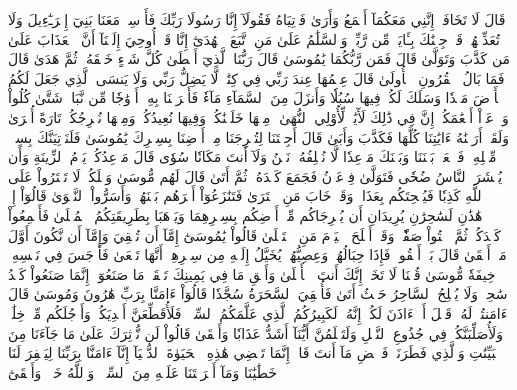 قَالَ لَا تَخَافَآۖ إِنَّنِي مَعَكُمَآ أَسۡمَعُ وَأَرَىٰ
فَأۡتِيَاهُ فَقُولَآ إِنَّا رَسُولَا رَبِّكَ فَأَرۡسِلۡ مَعَنَا بَنِيٓ إِسۡرَـٰٓءِيلَ وَلَا تُعَذِّبۡهُمۡۖ قَدۡ جِئۡنَٰكَ بِـَٔايَةٖ مِّن رَّبِّكَۖ وَٱلسَّلَٰمُ عَلَىٰ مَنِ ٱتَّبَعَ ٱلۡهُدَىٰٓ
إِنَّا قَدۡ أُوحِيَ إِلَيۡنَآ أَنَّ ٱلۡعَذَابَ عَلَىٰ مَن كَذَّبَ وَتَوَلَّىٰ
قَالَ فَمَن رَّبُّكُمَا يَٰمُوسَىٰ
قَالَ رَبُّنَا ٱلَّذِيٓ أَعۡطَىٰ كُلَّ شَيۡءٍ خَلۡقَهُۥ ثُمَّ هَدَىٰ
قَالَ فَمَا بَالُ ٱلۡقُرُونِ ٱلۡأُولَىٰ
قَالَ عِلۡمُهَا عِندَ رَبِّي فِي كِتَٰبٖۖ لَّا يَضِلُّ رَبِّي وَلَا يَنسَى
ٱلَّذِي جَعَلَ لَكُمُ ٱلۡأَرۡضَ مَهۡدٗا وَسَلَكَ لَكُمۡ فِيهَا سُبُلٗا وَأَنزَلَ مِنَ ٱلسَّمَآءِ مَآءٗ فَأَخۡرَجۡنَا بِهِۦٓ أَزۡوَٰجٗا مِّن نَّبَاتٖ شَتَّىٰ
كُلُواْ وَٱرۡعَوۡاْ أَنۡعَٰمَكُمۡۚ إِنَّ فِي ذَٰلِكَ لَأٓيَٰتٖ لِّأُوْلِي ٱلنُّهَىٰ
۞مِنۡهَا خَلَقۡنَٰكُمۡ وَفِيهَا نُعِيدُكُمۡ وَمِنۡهَا نُخۡرِجُكُمۡ تَارَةً أُخۡرَىٰ
وَلَقَدۡ أَرَيۡنَٰهُ ءَايَٰتِنَا كُلَّهَا فَكَذَّبَ وَأَبَىٰ
قَالَ أَجِئۡتَنَا لِتُخۡرِجَنَا مِنۡ أَرۡضِنَا بِسِحۡرِكَ يَٰمُوسَىٰ
فَلَنَأۡتِيَنَّكَ بِسِحۡرٖ مِّثۡلِهِۦ فَٱجۡعَلۡ بَيۡنَنَا وَبَيۡنَكَ مَوۡعِدٗا لَّا نُخۡلِفُهُۥ نَحۡنُ وَلَآ أَنتَ مَكَانٗا سُوٗى
قَالَ مَوۡعِدُكُمۡ يَوۡمُ ٱلزِّينَةِ وَأَن يُحۡشَرَ ٱلنَّاسُ ضُحٗى
فَتَوَلَّىٰ فِرۡعَوۡنُ فَجَمَعَ كَيۡدَهُۥ ثُمَّ أَتَىٰ
قَالَ لَهُم مُّوسَىٰ وَيۡلَكُمۡ لَا تَفۡتَرُواْ عَلَى ٱللَّهِ كَذِبٗا فَيُسۡحِتَكُم بِعَذَابٖۖ وَقَدۡ خَابَ مَنِ ٱفۡتَرَىٰ
فَتَنَٰزَعُوٓاْ أَمۡرَهُم بَيۡنَهُمۡ وَأَسَرُّواْ ٱلنَّجۡوَىٰ
قَالُوٓاْ إِنۡ هَٰذَٰنِ لَسَٰحِرَٰنِ يُرِيدَانِ أَن يُخۡرِجَاكُم مِّنۡ أَرۡضِكُم بِسِحۡرِهِمَا وَيَذۡهَبَا بِطَرِيقَتِكُمُ ٱلۡمُثۡلَىٰ
فَأَجۡمِعُواْ كَيۡدَكُمۡ ثُمَّ ٱئۡتُواْ صَفّٗاۚ وَقَدۡ أَفۡلَحَ ٱلۡيَوۡمَ مَنِ ٱسۡتَعۡلَىٰ
قَالُواْ يَٰمُوسَىٰٓ إِمَّآ أَن تُلۡقِيَ وَإِمَّآ أَن نَّكُونَ أَوَّلَ مَنۡ أَلۡقَىٰ
قَالَ بَلۡ أَلۡقُواْۖ فَإِذَا حِبَالُهُمۡ وَعِصِيُّهُمۡ يُخَيَّلُ إِلَيۡهِ مِن سِحۡرِهِمۡ أَنَّهَا تَسۡعَىٰ
فَأَوۡجَسَ فِي نَفۡسِهِۦ خِيفَةٗ مُّوسَىٰ
قُلۡنَا لَا تَخَفۡ إِنَّكَ أَنتَ ٱلۡأَعۡلَىٰ
وَأَلۡقِ مَا فِي يَمِينِكَ تَلۡقَفۡ مَا صَنَعُوٓاْۖ إِنَّمَا صَنَعُواْ كَيۡدُ سَٰحِرٖۖ وَلَا يُفۡلِحُ ٱلسَّاحِرُ حَيۡثُ أَتَىٰ
فَأُلۡقِيَ ٱلسَّحَرَةُ سُجَّدٗا قَالُوٓاْ ءَامَنَّا بِرَبِّ هَٰرُونَ وَمُوسَىٰ
قَالَ ءَامَنتُمۡ لَهُۥ قَبۡلَ أَنۡ ءَاذَنَ لَكُمۡۖ إِنَّهُۥ لَكَبِيرُكُمُ ٱلَّذِي عَلَّمَكُمُ ٱلسِّحۡرَۖ فَلَأُقَطِّعَنَّ أَيۡدِيَكُمۡ وَأَرۡجُلَكُم مِّنۡ خِلَٰفٖ وَلَأُصَلِّبَنَّكُمۡ فِي جُذُوعِ ٱلنَّخۡلِ وَلَتَعۡلَمُنَّ أَيُّنَآ أَشَدُّ عَذَابٗا وَأَبۡقَىٰ
قَالُواْ لَن نُّؤۡثِرَكَ عَلَىٰ مَا جَآءَنَا مِنَ ٱلۡبَيِّنَٰتِ وَٱلَّذِي فَطَرَنَاۖ فَٱقۡضِ مَآ أَنتَ قَاضٍۖ إِنَّمَا تَقۡضِي هَٰذِهِ ٱلۡحَيَوٰةَ ٱلدُّنۡيَآ
إِنَّآ ءَامَنَّا بِرَبِّنَا لِيَغۡفِرَ لَنَا خَطَٰيَٰنَا وَمَآ أَكۡرَهۡتَنَا عَلَيۡهِ مِنَ ٱلسِّحۡرِۗ وَٱللَّهُ خَيۡرٞ وَأَبۡقَىٰٓ
